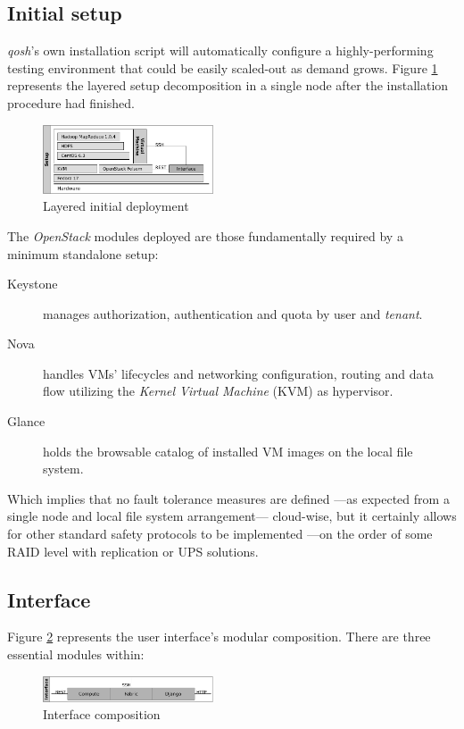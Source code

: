 \documentclass{sig-alternate}
\begin{document}
\subsection{Initial setup}
\noindent \emph{qosh}'s own installation script will automatically configure a highly-performing testing environment that could be easily scaled-out as demand grows. Figure \ref{fig:initial} represents the layered setup decomposition in a single node after the installation procedure had finished.

\begin{figure}[tbp]
\centering
\includegraphics[width=0.45\textwidth]{img/005}
\caption{Layered initial deployment}
\label{fig:initial}
\end{figure}

The \emph{OpenStack} modules deployed are those fundamentally required by a minimum standalone setup:

\begin{description}
 \item[Keystone] manages authorization, authentication and quota by user and \emph{tenant}.
 \item[Nova] handles VMs' lifecycles and networking configuration, routing and data flow utilizing the \emph{Kernel Virtual Machine} (KVM) as hypervisor.
 \item[Glance] holds the browsable catalog of installed VM images on the local file system.
\end{description}

Which implies that no fault tolerance measures are defined ---as expected from a single node and local file system arrangement--- cloud-wise, but it certainly allows for other standard safety protocols to be implemented ---on the order of some RAID level with replication or UPS solutions.


\subsection{Interface}
\noindent Figure \ref{fig:interface} represents the user interface's modular composition. There are three essential modules within:

\begin{figure}[tbp]
\centering
\includegraphics[width=0.45\textwidth]{img/003}
\caption{Interface composition}
\label{fig:interface}
\end{figure}
\end{document}
